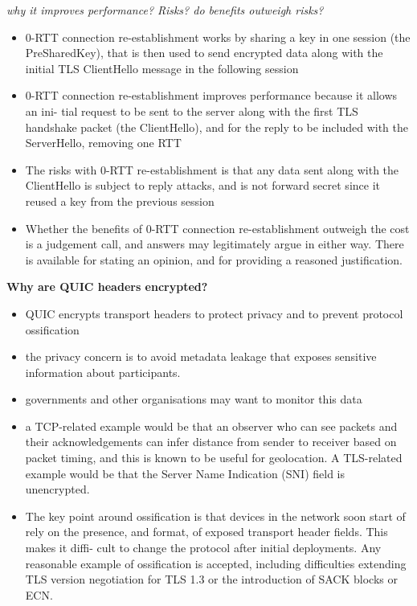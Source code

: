 \documentclass{article}
\begin{document}
\textit{why it improves performance? Risks? do benefits outweigh risks?}
\begin{itemize}
    \item 0-RTT connection re-establishment works by sharing a key in one session
    (the PreSharedKey), that is then used to send encrypted data along with the initial
    TLS ClientHello message in the following session
    \item 0-RTT connection re-establishment improves performance because it allows an ini-
    tial request to be sent to the server along with the first TLS handshake packet (the
    ClientHello), and for the reply to be included with the ServerHello, removing one RTT
    \item The risks with 0-RTT re-establishment is that any data sent along with the
    ClientHello is subject to reply attacks, and is not forward secret since it
    reused a key from the previous session
    \item  Whether the benefits of 0-RTT connection re-establishment outweigh the cost is a
    judgement call, and answers may legitimately argue in either way. There is
    available for stating an opinion, and for providing a reasoned justification.
\end{itemize}

\clearpage

\textbf{Why are QUIC headers encrypted?}
\begin{itemize}
    \item QUIC encrypts transport headers to protect privacy and to prevent protocol
    ossification
    \item the privacy concern is to avoid metadata leakage that exposes sensitive information about participants.
    \item governments and other organisations may want to monitor this data
    \item a TCP-related example would be that an observer who can see packets and their
    acknowledgements can infer distance from sender to receiver based on packet timing,
    and this is known to be useful for geolocation. A TLS-related example would be that
    the Server Name Indication (SNI) field is unencrypted.
    \item  The key point around ossification is that devices in the network soon start of rely on the
    presence, and format, of exposed transport header fields. This makes it diffi-
    cult to change the protocol after initial deployments. Any reasonable example
    of ossification is accepted, including difficulties extending TLS version negotiation for
    TLS 1.3 or the introduction of SACK blocks or ECN\@.
\end{itemize}
\end{document}
